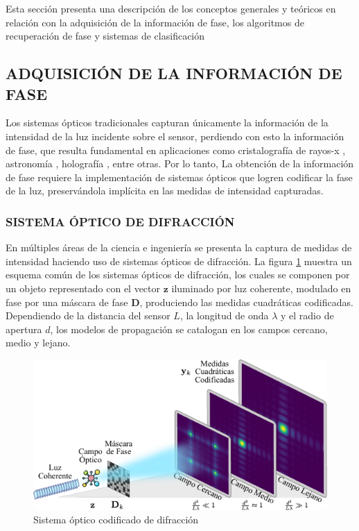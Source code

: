 Esta sección presenta una descripción de los conceptos generales y teóricos en relación con la adquisición de la información de fase, los algoritmos de recuperación de fase y sistemas de clasificación

\subsection{ADQUISICIÓN DE LA INFORMACIÓN DE FASE}

Los sistemas ópticos tradicionales capturan únicamente la información de la intensidad de la luz incidente sobre el sensor, perdiendo con esto la información de fase, que resulta fundamental en aplicaciones como cristalografía de rayos-x \cite{pinilla2018coded}, astronomía \cite{fienup1987phase}, holografía \cite{rivenson2018phase}, entre otras. Por lo tanto, La obtención de la información de  fase  requiere la implementación  de sistemas ópticos que logren codificar la fase de la luz, preservándola implícita en las medidas de intensidad capturadas. 
    
\subsubsection{SISTEMA ÓPTICO DE DIFRACCIÓN}
En múltiples áreas de la ciencia e ingeniería se presenta la captura de medidas de intensidad haciendo uso de sistemas ópticos de difracción\cite{fienup1987phase,pinilla2018coded,rivenson2018phase}. La figura \ref{fig:difraction_systems} muestra un esquema común de los sistemas ópticos de difracción, los cuales se componen por un objeto representado con el vector $\mathbf{z}$ iluminado por luz coherente, modulado en fase por una máscara de fase $\mathbf{D}$, produciendo las medidas cuadráticas codificadas. Dependiendo de la distancia del sensor $L$, la longitud de onda $\lambda$ y el radio de apertura $d$, los modelos de propagación se catalogan en los campos cercano, medio y lejano.

\begin{figure}[H]
    \centering
    \includegraphics[width=\linewidth]{images/DiffractionSystem.pdf}
    \caption{\hspace{2mm}Sistema óptico codificado de difracción}
    \label{fig:difraction_systems}
\end{figure}

